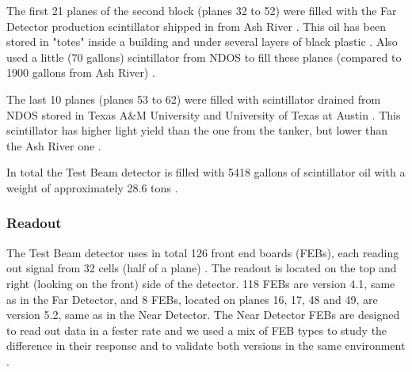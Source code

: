 \documentclass[12pt,a4paper]{article}
\begin{document}

The first 21 planes of the second block (planes 32 to 52) were filled with the Far Detector production scintillator shipped in from Ash River \cite{NOVA-doc-41961}. This oil has been stored in "totes" inside a building and under several layers of black plastic \cite{NOVA-doc-34067}. Also used a little (70 gallons) scintillator from NDOS to fill these planes (compared to 1900 gallons from Ash River) \cite{NOVA-doc-41961}.

The last 10 planes (planes 53 to 62) \cite{NOVA-doc-41961} were filled with scintillator drained from NDOS stored in Texas A\&M University and University of Texas at Austin \cite{NOVA-doc-38740, NOVA-doc-39088}. This scintillator has higher light yield than the one from the tanker, but lower than the Ash River one \cite{NOVA-doc-38740}.


In total the Test Beam detector is filled with 5418 gallons of scintillator oil with a weight of approximately 28.6 tons \cite{NOVA-doc-29543}.

\subsubsection*{Readout}
The Test Beam detector uses in total 126 front end boards (FEBs), each reading out signal from 32 cells (half of a plane) \cite{NOVA-doc-29543}. The readout is located on the top and right (looking on the front) side of the detector. 118 FEBs are version 4.1, same as in the Far Detector, and 8 FEBs, located on planes 16, 17, 48 and 49, are version 5.2, same as in the Near Detector. The Near Detector FEBs are designed to read out data in a fester rate and we used a mix of FEB types to study the difference in their response and to validate both versions in the same environment \cite{TeresaThesis}.

\end{document}
